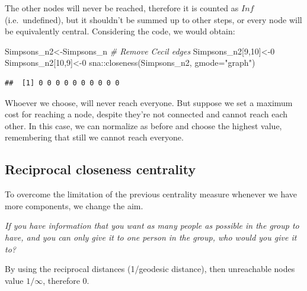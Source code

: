 \documentclass[
  notitlepage,
  onecolumn,
  openany]{book}
\newenvironment{Shaded}{\begin{snugshade}}{\end{snugshade}}
\newcommand{\AttributeTok}[1]{\textcolor[rgb]{0.77,0.63,0.00}{#1}}
\newcommand{\CommentTok}[1]{\textcolor[rgb]{0.56,0.35,0.01}{\textit{#1}}}
\newcommand{\ConstantTok}[1]{\textcolor[rgb]{0.00,0.00,0.00}{#1}}
\newcommand{\DecValTok}[1]{\textcolor[rgb]{0.00,0.00,0.81}{#1}}
\newcommand{\FunctionTok}[1]{\textcolor[rgb]{0.00,0.00,0.00}{#1}}
\newcommand{\NormalTok}[1]{#1}
\newcommand{\OtherTok}[1]{\textcolor[rgb]{0.56,0.35,0.01}{#1}}
\newcommand{\SpecialCharTok}[1]{\textcolor[rgb]{0.00,0.00,0.00}{#1}}
\newcommand{\StringTok}[1]{\textcolor[rgb]{0.31,0.60,0.02}{#1}}
\begin{document}
The other nodes will never be reached, therefore it is counted as \(Inf\) (i.e.~undefined), but it shouldn't be summed up to other steps, or every node will be equivalently central. Considering the code, we would obtain:

\begin{Shaded}
\begin{Highlighting}[]
\NormalTok{Simpsons\_n2}\OtherTok{\textless{}{-}}\NormalTok{Simpsons\_n}
\CommentTok{\# Remove Cecil edges}
\NormalTok{Simpsons\_n2[}\DecValTok{9}\NormalTok{,}\DecValTok{10}\NormalTok{]}\OtherTok{\textless{}{-}}\DecValTok{0}
\NormalTok{Simpsons\_n2[}\DecValTok{10}\NormalTok{,}\DecValTok{9}\NormalTok{]}\OtherTok{\textless{}{-}}\DecValTok{0}
\NormalTok{sna}\SpecialCharTok{::}\FunctionTok{closeness}\NormalTok{(Simpsons\_n2, }\AttributeTok{gmode=}\StringTok{"graph"}\NormalTok{)}
\end{Highlighting}
\end{Shaded}

\begin{verbatim}
##  [1] 0 0 0 0 0 0 0 0 0 0
\end{verbatim}

Whoever we choose, will never reach everyone. But suppose we set a maximum cost for reaching a node, despite they're not connected and cannot reach each other. In this case, we can normalize as before and choose the highest value, remembering that still we cannot reach everyone.

\hypertarget{reciprocal-closeness-centrality}{%
\subsection{Reciprocal closeness centrality}\label{reciprocal-closeness-centrality}}

To overcome the limitation of the previous centrality measure whenever we have more components, we change the aim.

\emph{If you have information that you want as many people as possible in the group to have, and you can only give it to one person in the group, who would you give it to?}

By using the reciprocal distances (1/geodesic distance), then unreachable nodes value \(1/\infty\), therefore 0.

\begin{Shaded}
\end{Shaded}
\end{document}
